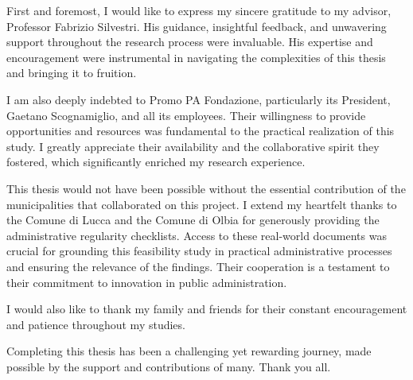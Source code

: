 \documentclass[../main.tex]{subfiles}
\begin{document}
\begin{acknowledgments}
First and foremost, I would like to express my sincere gratitude to my advisor, Professor Fabrizio Silvestri. His guidance, insightful feedback, and unwavering support throughout the research process were invaluable. His expertise and encouragement were instrumental in navigating the complexities of this thesis and bringing it to fruition.

I am also deeply indebted to Promo PA Fondazione, particularly its President, Gaetano Scognamiglio, and all its employees. Their willingness to provide opportunities and resources was fundamental to the practical realization of this study. I greatly appreciate their availability and the collaborative spirit they fostered, which significantly enriched my research experience.

This thesis would not have been possible without the essential contribution of the municipalities that collaborated on this project. I extend my heartfelt thanks to the Comune di Lucca and the Comune di Olbia for generously providing the administrative regularity checklists. Access to these real-world documents was crucial for grounding this feasibility study in practical administrative processes and ensuring the relevance of the findings. Their cooperation is a testament to their commitment to innovation in public administration.

I would also like to thank my family and friends for their constant encouragement and patience throughout my studies.

Completing this thesis has been a challenging yet rewarding journey, made possible by the support and contributions of many. Thank you all.

\end{acknowledgments}
\end{document}
